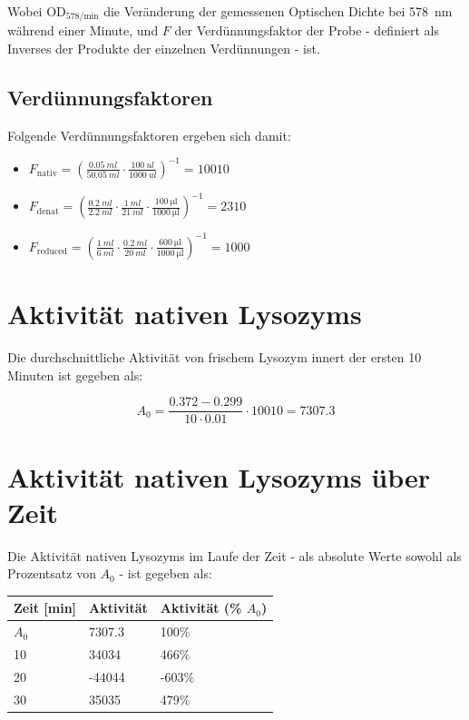\documentclass[a4paper,german]{scrreprt}
\begin{document}
Wobei $\text{OD}_{578 / \text{min}}$ die Veränderung der gemessenen Optischen
Dichte bei \SI{578}{nm} während einer Minute, und $F$ der Verdünnungsfaktor der
Probe - definiert als Inverses der Produkte der einzelnen Verdünnungen - ist.

\subsection{Verdünnungsfaktoren}

Folgende Verdünnungsfaktoren ergeben sich damit:
\begin{itemize}
	\item $F_{\text{nativ}} = \left (
			\frac{\SI{0.05}{ml}}{\SI{50.05}{ml}} \cdot
	                \frac{\SI{100}{ul}}{\SI{1000}{ul}}
		\right )^{-1} = 10010$
	\item $F_{\text{denat}} = \left (
			\frac{\SI{0.2}{ml}}{\SI{2.2}{ml}} \cdot
			\frac{\SI{1}{ml}}{\SI{21}{ml}} \cdot
			\frac{\SI{100}{\ul}}{\SI{1000}{\ul}}
		\right )^{-1} = 2310$
	\item $F_{\text{reduced}} = \left (
			\frac{\SI{1}{ml}}{\SI{6}{ml}} \cdot
			\frac{\SI{0.2}{ml}}{\SI{20}{ml}} \cdot
			\frac{\SI{600}{\ul}}{\SI{1000}{\ul}}
		\right )^{-1} = 1000$
\end{itemize}

\section{Aktivität nativen Lysozyms}

Die durchschnittliche Aktivität von frischem Lysozym innert der ersten 10
Minuten ist gegeben als:

\[
	A_0 = \frac{0.372 - 0.299}{10 \cdot 0.01} \cdot 10010 = 7307.3
\]

\section{Aktivität nativen Lysozyms über Zeit}

Die Aktivität nativen Lysozyms im Laufe der Zeit - als absolute Werte sowohl
als Prozentsatz von $A_0$ - ist gegeben als:
\\

\begin{tabu}{|l|l|l|}
	\hline
	Zeit [min] & Aktivität & Aktivität (\% $A_0$) \\
	\hline
	$A_0$ & 7307.3 & 100\% \\
	10 & 34034 & 466\% \\ 
	20 & -44044 & -603\% \\ 
	30 & 35035 & 479\% \\ 
	\hline
\end{tabu}
\\
\end{document}
